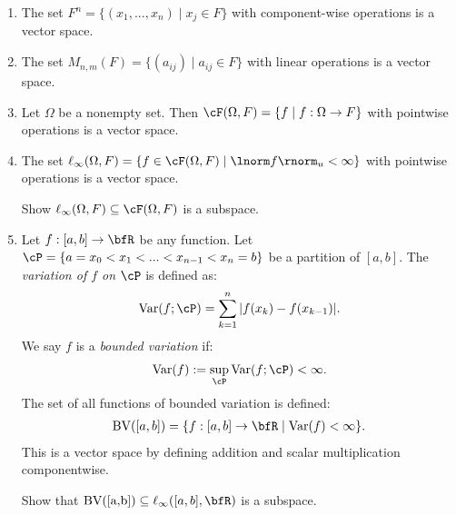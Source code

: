     \begin{example}
        \phantom{a}
        \begin{enumerate}[label = (\arabic*),itemsep=1pt,topsep=3pt]
            \item The set $F^n = \{(x_1,...,x_n) \mid x_j \in F\}$ with component-wise operations is a vector space.
            \item The set $M_{n,m}(F) = \{(a_{ij}) \mid a_{ij} \in F\}$ with linear operations is a vector space.
            \item Let $\Omega$ be a nonempty set. Then $\cF(\Omega,F) = \{f \mid f:\Omega \rightarrow F\}$ with pointwise operations is a vector space.
            \item The set $\ell_\infty(\Omega,F) = \{f \in \cF(\Omega,F) \mid \lnorm f \rnorm _u < \infty \}$ with pointwise operations is a vector space.
                \begin{exercise}
                    Show $\ell_\infty(\Omega,F) \subseteq \cF(\Omega,F)$ is a subspace.
                \end{exercise}

            \item Let $f:[a,b] \rightarrow \bfR$ be any function. Let $\cP = \{a = x_0 < x_1 < ... < x_{n-1} < x_n = b\}$ be a partition of $[a,b]$. The \textit{variation of $f$ on $\cP$} is defined as:
            \begin{equation*}
            \begin{split}
                \text{Var}(f;\cP) = \sum_{k = 1}^n |f(x_k) - f(x_{k-1})|.
            \end{split}
            \end{equation*}
        We say $f$ is a \textit{bounded variation} if:
            \begin{equation*}
            \begin{split}
                \text{Var}(f) := \sup_{\cP}\text{Var}(f;\cP) < \infty.
            \end{split}
            \end{equation*}
        The set of all functions of bounded variation is defined:
            \begin{equation*}
            \begin{split}
                \text{BV}([a,b]) = \{f:[a,b] \rightarrow \bfR \mid \text{Var}(f) < \infty\}.
            \end{split}
            \end{equation*}
        This is a vector space by defining addition and scalar multiplication componentwise.
            \begin{exercise}\label{ex:bv-subspace}
                Show that $\text{BV([a,b])} \subseteq \ell_\infty([a,b],\bfR)$ is a subspace.
            \end{exercise}


\end{enumerate}
\end{example}
